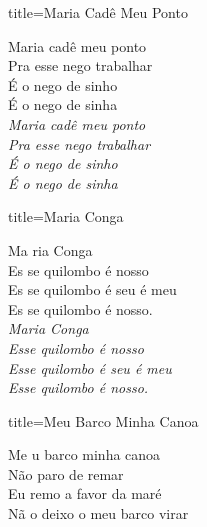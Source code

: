 \documentclass[fontsize=14pt, paper=a4, twoside, DIV=20]{scrreprt} %
\begin{document}
\begin{multicols*}{2}
\begin{song}{title={Maria Cadê Meu Ponto}}
        \begin{verse*}
            Maria cadê meu ponto\\
            Pra esse nego trabalhar\\
            É o nego de sinho\\
            É o nego de sinha\\
            \textit{Maria cadê meu ponto\\
            Pra esse nego trabalhar\\
            É o nego de sinho\\
            É o nego de sinha\\
}
        \end{verse*}
\end{song}

\begin{song}{title={Maria Conga}}
        \begin{verse*}
            Ma ria Conga\\
            Es se quilombo é nosso\\
            Es se quilombo é seu é meu\\
            Es se quilombo é nosso.\\
            \textit{Maria Conga}\\
            \textit{Esse quilombo é nosso}\\
            \textit{Esse quilombo é seu é meu}\\
            \textit{Esse quilombo é nosso.}\\
        \end{verse*}
\end{song}


\begin{song}{title={Meu Barco Minha Canoa}}
        \begin{verse*}
            Me u barco minha canoa\\
            Não paro de remar\\
            Eu remo a favor da maré\\
            Nã o deixo o meu barco virar\\


\end{verse*}
\end{song}
\end{multicols*}
\end{document}
